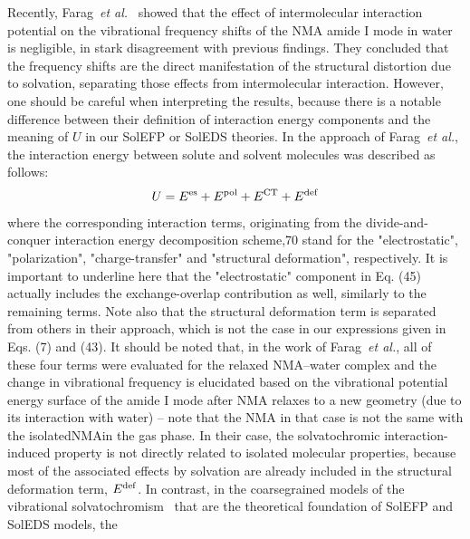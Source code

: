 \documentclass[a4paper,titlepage,twoside,fleqn,12pt]{book}
\begin{document}
\begin{refsection}
Recently, Farag~\emph{et al.}~\citep{Farag.Ruiz-Lopez.Bastida.Monard.Ingrosso.JPCB.2015} 
showed that the effect of intermolecular
interaction potential on the vibrational frequency
shifts of the NMA amide I mode in water is negligible, in
stark disagreement with previous findings.\citep{Blasiak.Lee.Cho.JCP.2013,Blasiak.Cho.JCP.2014} 
They concluded that the frequency shifts are the
direct manifestation of the structural distortion due to solvation,
separating those effects from intermolecular interaction.
However, one should be careful when interpreting the results,
because there is a notable difference between their definition
of interaction energy components and the meaning of $U$ in our
SolEFP or SolEDS theories. In the approach of Farag~\emph{et al.},
the interaction energy between solute and solvent molecules
was described as follows:
%
\begin{equation} \label{e:farag}
 U =  E^{\rm es} + E^{\rm pol} + E^{\rm CT} + E^{\rm def}
\end{equation}
%
where the corresponding interaction terms, originating from
the divide\hyp{}and\hyp{}conquer interaction energy decomposition
scheme,70 stand for the "electrostatic", "polarization", "charge\hyp{}transfer"
and "structural deformation", respectively. It is
important to underline here that the "electrostatic" component
in Eq. (45) actually includes the exchange\hyp{}overlap contribution
as well, similarly to the remaining terms.\citep{vanderVaart.Merz.JPCA.1999} 
Note also that the
structural deformation term is separated from others in their
approach, which is not the case in our expressions given in
Eqs. (7) and (43). It should be noted that, in the work of Farag~\emph{et al.}, 
all of these four terms were evaluated for the relaxed
NMA--water complex and the change in vibrational frequency
is elucidated based on the vibrational potential energy surface
of the amide I mode after NMA relaxes to a new geometry (due
to its interaction with water) -- note that the NMA in that case
is not the same with the isolatedNMAin the gas phase. In their
case, the solvatochromic interaction\hyp{}induced property is not
directly related to isolated molecular properties, because most
of the associated effects by solvation are already included in
the structural deformation term, $E^{\rm def}$. In contrast, in the coarsegrained
models of the vibrational solvatochromism~\citep{Buckingham.ProcRSocLondonA.1958,
Buckingham.ProcRSocLondonA.1960,
Buckingham.TransFaradaySoc.1960,
Cho.JCP.2003,Cho.JCP.2009} 
that are
the theoretical foundation of SolEFP and SolEDS models, the

\end{refsection}
\end{document}
